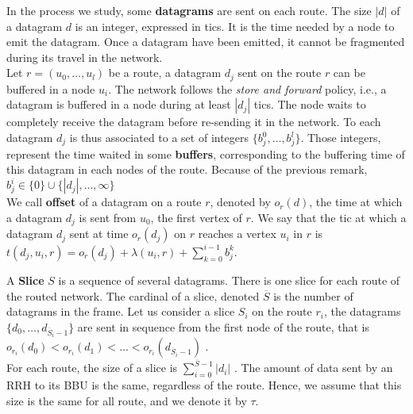 \documentclass[10pt]{article}
\begin{document}
        In the process we study, some {\bf datagrams} are sent on each route. The size $|d|$ of a datagram $d$ is an integer, expressed in tics. It is the time needed by a node to emit the datagram. Once a datagram have been emitted, it cannot be fragmented during its travel in the network. \\
          Let $r=(u_0,\dots,u_l)$ be a route, a datagram $d_j$ sent on the route $r$ can be buffered in a node $u_i$. The network follows the {\em store and forward} policy, i.e., a datagram is buffered in a node during at least $|d_j|$ tics. The node waits to completely receive the datagram before re-sending it in the network. To each datagram $d_j$ is thus associated to a set of integers $\{b_j^0,\ldots,b_j^l\}$. Those integers, represent the time waited in some \textbf{buffers}, corresponding to the buffering time of this datagram in each nodes of the route. Because of the previous remark, $b_j^i \in \{0\} \cup \{|d_j|, \ldots,\infty\}$\\
          We call \textbf{offset} of a datagram on a route  $r$, denoted by $o_r(d)$, the time at which a datagram $d_j$ is sent from $u_0$, the first vertex of $r$. We say that the tic at which a datagram $d_j$ sent at time $o_r(d_j)$ on $r$ reaches a vertex $u_i$ in $r$ is $t(d_j,u_i,r) = o_r(d_j) + \lambda(u_i,r) + \sum_{k=0}^{i-1}b_j^k $.
   
        A {\bf Slice} $S$ is a sequence of several datagrams. There is one slice for each route of the routed network. The cardinal of a slice, denoted $\overline S$ is the number of datagrams in the frame. Let us consider a slice $S_i$ on the route $r_i$, the datagrams $\{d_0,\ldots,d_{\overline S_i-1}\}$ are sent in sequence from the first node of the route, that is $o_{r_i}(d_0) < o_{r_i}(d_1) < \ldots < o_{r_i}(d_{\overline S_i-1})$ . \\
       For each route, the size of a slice is $\sum_{i=0}^{{\overline S-1}} |d_i|$ . The amount of data sent by an RRH to its BBU is the same, regardless of the route. Hence, we assume that this size is the same for all route, and we denote it by $\tau$. 
        
       
      
\end{document}

